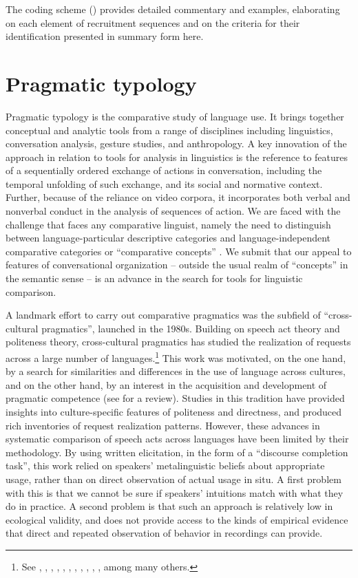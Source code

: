 \documentclass[output=paper,modfonts,nonflat]{langsci/langscibook}
\begin{document}
The coding scheme () provides detailed commentary and examples, elaborating on each element of recruitment sequences and on the criteria for their identification presented in summary form here. %

\section{Pragmatic typology}\label{sec:intro:5}

Pragmatic typology is the comparative study of language use. It brings together conceptual and analytic tools from a range of disciplines including linguistics, conversation analysis, gesture studies, and anthropology. A key innovation of the approach in relation to tools for analysis in linguistics is the reference to features of a sequentially ordered exchange of actions in conversation, including the temporal unfolding of such exchange, and its social and normative context. Further, because of the reliance on video corpora, it incorporates both verbal and nonverbal conduct in the analysis of sequences of action. We are faced with the challenge that faces any comparative linguist, namely the need to distinguish between language-particular descriptive categories and language-independent comparative categories or “comparative concepts” \citep{Haspelmath2010}. We submit that our appeal to features of conversational organization -- outside the usual realm of “concepts” in the semantic sense -- is an advance in the search for tools for linguistic comparison.

A landmark effort to carry out comparative pragmatics was the subfield of “cross-cultural pragmatics”, launched in the 1980s. Building on speech act theory and politeness theory, cross-cultural pragmatics has studied the realization of requests across a large number of languages.\footnote{See \citet{HouseKasper1981}, \citet{Blum-KulkaEtAl1989}, \citet{Sifianou1992}, \citet{Lee-Wong1994}, \citet{LePair1996}, \citet{MárquezReiter2000}, \citet{TsuzukiEtAl2005}, \citet{RueZhang2008}, \citet{FélixBrasdefer2009}, \citet{Ogiermann2009}, \citet{Peterson2010}, among many others.} This work was motivated, on the one hand, by a search for similarities and differences in the use of language across cultures, and on the other hand, by an interest in the acquisition and development of pragmatic competence (see \citealt{Woodfield2008} for a review). Studies in this tradition have provided insights into culture-specific features of politeness and directness, and produced rich inventories of request realization patterns. However, these advances in systematic comparison of speech acts across languages have been limited by their methodology. By using written elicitation, in the form of a “discourse completion task”, this work relied on speakers' metalinguistic beliefs about appropriate usage, rather than on direct observation of actual usage in situ. A first problem with this is that we cannot be sure if speakers' intuitions match with what they do in practice. A second problem is that such an approach is relatively low in ecological validity, and does not provide access to the kinds of empirical evidence that direct and repeated observation of behavior in recordings can provide.
\end{document}
